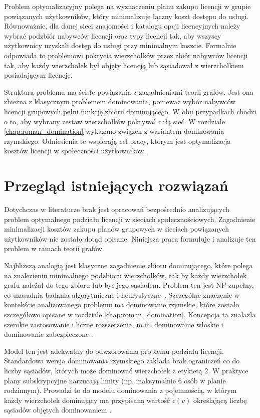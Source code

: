 Problem optymalizacyjny polega na wyznaczeniu planu zakupu licencji w grupie powiązanych użytkowników, który minimalizuje łączny koszt dostępu do usługi. Równoważnie, dla danej sieci znajomości i katalogu opcji licencyjnych należy wybrać podzbiór nabywców licencji oraz typy licencji tak, aby wszyscy użytkownicy uzyskali dostęp do usługi przy minimalnym koszcie. Formalnie odpowiada to problemowi pokrycia wierzchołków przez zbiór nabywców licencji tak, aby każdy wierzchołek był objęty licencją lub sąsiadował z wierzchołkiem posiadającym licencję.

Struktura problemu ma ścisłe powiązania z zagadnieniami teorii grafów. Jest ona zbieżna z klasycznym problemem dominowania, ponieważ wybór nabywców licencji grupowych pełni funkcję zbioru dominującego. W obu przypadkach chodzi o to, aby wybrany zestaw wierzchołków pokrywał całą sieć. W rozdziale \ref{chap:roman_domination} wykazano związek z wariantem dominowania rzymskiego. Odniesienia te wspierają cel pracy, którym jest optymalizacja kosztów licencji w społeczności użytkowników.

\section{Przegląd istniejących rozwiązań}

Dotychczas w literaturze brak jest opracowań bezpośrednio analizujących problem optymalnego podziału licencji w sieciach społecznościowych. Zagadnienie minimalizacji kosztów zakupu planów grupowych w sieciach powiązanych użytkowników nie zostało dotąd opisane. Niniejsza praca formułuje i analizuje ten problem w ramach teorii grafów.

Najbliższą analogią jest klasyczne zagadnienie zbioru dominującego, które polega na znalezieniu minimalnego podzbioru wierzchołków, tak by każdy wierzchołek grafu należał do tego zbioru lub był jego sąsiadem. Problem ten jest NP-zupełny, co uzasadnia badania algorytmiczne i heurystyczne~\cite{garey1979}. Szczególne znaczenie w kontekście analizowanego problemu ma dominowanie rzymskie, które zostało szczegółowo opisane w rozdziale \ref{chap:roman_domination}. Koncepcja ta znalazła szerokie zastosowanie i liczne rozszerzenia, m.in. dominowanie włoskie i dominowanie zabezpieczone \cite{Roman2DominationSurvey}.

Model ten jest adekwatny do odwzorowania problemu podziału licencji. Standardowa wersja dominowania rzymskiego zakłada brak ograniczeń co do liczby sąsiadów, których może dominować wierzchołek z etykietą $2$. W praktyce plany subskrypcyjne narzucają limity (np. maksymalnie $6$ osób w planie rodzinnym). Prowadzi to do modelu dominowania z pojemnością, w którym każdy wierzchołek dominujący ma przypisaną wartość $c(v)$ określającą liczbę sąsiadów objętych dominowaniem \cite{CapDom}.

